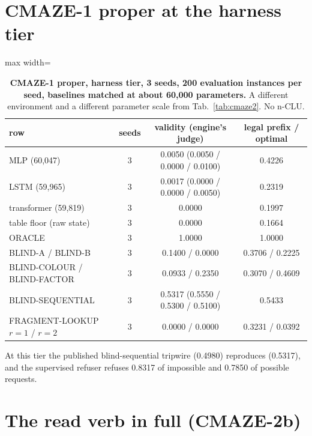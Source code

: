 \documentclass{article} %
\begin{document}
\section{CMAZE-1 proper at the harness tier}
\label{app:cmaze1}

\begin{table}[h]
\centering\small
\caption{\textbf{CMAZE-1 proper, harness tier, 3 seeds, 200 evaluation instances per seed, baselines %
matched at about 60,000 parameters.} A different environment and a different parameter scale from %
Tab.~\ref{tab:cmaze2}. No n-CLU.}
\label{tab:cmaze1}
\begin{adjustbox}{max width=\linewidth}\begin{tabular}{lccc}
\toprule
row & seeds & validity (engine's judge) & legal prefix / optimal \\
\midrule
MLP (60,047) & 3 & 0.0050 (0.0050 / 0.0000 / 0.0100) & 0.4226 \\
LSTM (59,965) & 3 & 0.0017 (0.0000 / 0.0000 / 0.0050) & 0.2319 \\
transformer (59,819) & 3 & 0.0000 & 0.1997 \\
table floor (raw state) & 3 & 0.0000 & 0.1664 \\
ORACLE & 3 & 1.0000 & 1.0000 \\
BLIND-A / BLIND-B & 3 & 0.1400 / 0.0000 & 0.3706 / 0.2225 \\
BLIND-COLOUR / BLIND-FACTOR & 3 & 0.0933 / 0.2350 & 0.3070 / 0.4609 \\
BLIND-SEQUENTIAL & 3 & 0.5317 (0.5550 / 0.5300 / 0.5100) & 0.5433 \\
FRAGMENT-LOOKUP $r=1$ / $r=2$ & 3 & 0.0000 / 0.0000 & 0.3231 / 0.0392 \\
\bottomrule
\end{tabular}\end{adjustbox}
\end{table}

\noindent At this tier the published blind-sequential tripwire (0.4980) reproduces (0.5317), and
the supervised refuser refuses 0.8317 of impossible and 0.7850 of possible requests.

\section{The read verb in full (CMAZE-2b)}
\label{app:verb}
\end{document}
